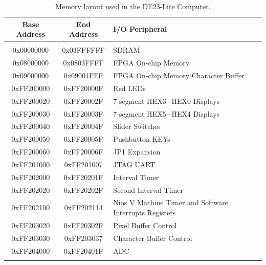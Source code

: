 \documentclass[11pt, twoside, pdftex]{article}
\newcommand{\systemName}{DE23-Lite Computer}
\begin{document}
\begin{table}[h]
    \begin{center}
    \begin{tabular}{c|c|l}
            \textbf{Base Address}
            & \textbf{End Address}
            & \textbf{I/O Peripheral}
				\\\hline\vspace{-3mm}\\
            0x00000000
            & 0x03FFFFFF
            & SDRAM
        \\
            0x08000000
            & 0x0803FFFF
            & FPGA On-chip Memory
        \\
            0x09000000
            & 0x09001FFF
            & FPGA On-chip Memory Character Buffer
        \\
            0xFF200000
            & 0xFF20000F
            & Red LEDs
        \\
            0xFF200020
            & 0xFF20002F
            & 7-segment HEX3$-$HEX0 Displays
        \\
            0xFF200030
            & 0xFF20003F
            & 7-segment HEX5$-$HEX4 Displays

        \\
            0xFF200040
            & 0xFF20004F
            & Slider Switches
        \\
            0xFF200050
            & 0xFF20005F
            & Pushbutton KEYs
        \\
            0xFF200060
            & 0xFF20006F
            & JP1 Expansion
        \\
            0xFF201000
            & 0xFF201007
            & JTAG UART
        \\
            0xFF202000
            & 0xFF20201F
            & Interval Timer
        \\
            0xFF202020
            & 0xFF20202F
            & Second Interval Timer
        \\
            0xFF202100
            & 0xFF202114
            & Nios V Machine Timer and Software Interrupts Registers
        \\
            0xFF203020
            & 0xFF20302F
            & Pixel Buffer Control
        \\
            0xFF203030
            & 0xFF203037
            & Character Buffer Control
        \\
            0xFF204000
            & 0xFF20401F
            & ADC
        \\
        \\
    \end{tabular}
    \caption{Memory layout used in the \systemName.}
    \label{tab:memorylayout}
    \end{center}
\end{table}
\end{document}
